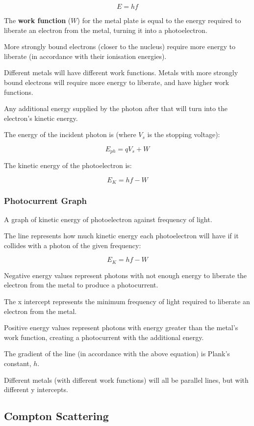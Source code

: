 \documentclass[a4paper,11pt]{report}
\begin{document}
$$
E = hf
$$

The \textbf{work function} ($W$) for the metal plate is equal to the energy
required to liberate an electron from the metal, turning it into a
photoelectron.

More strongly bound electrons (closer to the nucleus) require more energy to
liberate (in accordance with their ionisation energies).

Different metals will have different work functions. Metals with more strongly
bound electrons will require more energy to liberate, and have higher work
functions.

Any additional energy supplied by the photon after that will turn into the
electron's kinetic energy.

The energy of the incident photon is (where $V_s$ is the stopping voltage):

$$
E_{ph} = qV_s + W
$$

The kinetic energy of the photoelectron is:

$$
E_K = hf - W
$$

\subsubsection{Photocurrent Graph}


A graph of kinetic energy of photoelectron against frequency of light.

The line represents how much kinetic energy each photoelectron will have if it
collides with a photon of the given frequency:

$$
E_K = hf - W
$$

Negative energy values represent photons with not enough energy to liberate the
electron from the metal to produce a photocurrent.

The x intercept represents the minimum frequency of light required to liberate
an electron from the metal.

Positive energy values represent photons with energy greater than the metal's
work function, creating a photocurrent with the additional energy.

The gradient of the line (in accordance with the above equation) is Plank's
constant, $h$.

Different metals (with different work functions) will all be parallel lines,
but with different y intercepts.

\subsection{Compton Scattering}
\end{document}
